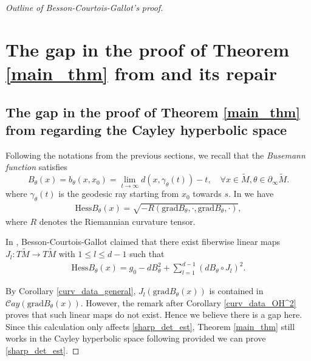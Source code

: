 \documentclass{article}
\newcommand{\del}{\partial}
\newcommand{\grad}{\mathrm{grad}}
\newcommand{\hess}{\mathrm{Hess}}
\newcommand{\Cay}{\mathcal{C}ay}
\theoremstyle{definition}
\begin{document}
\begin{proof}[Outline of Besson-Courtois-Gallot's proof]
\section{The gap in the proof of Theorem \ref{main_thm} from \cite{BCG1} and its repair}
\subsection{The gap in the proof of Theorem \ref{main_thm} from \cite{BCG1} regarding the Cayley hyperbolic space}\label{s3}
Following the notations from the previous sections, we recall that the \emph{Busemann function} satisfies
$$B_{\theta}(x)=b_\theta(x,x_0)=\lim_{t\to\infty}d(x,\gamma_\theta(t))-t,\quad\forall x\in \widetilde M, \theta\in\del_\infty \widetilde M.$$
where $\gamma_\theta(t)$ is the geodesic ray starting from $x_0$ towards $s$. In \cite[page 36]{CF} we have
\begin{align}\label{hess_gen_formula}\hess B_\theta(x)=\sqrt{-R(\grad B_\theta,\cdot,\grad B_\theta,\cdot)},\end{align}
where $R$ denotes the Riemannian curvature tensor.

In \cite[page 751]{BCG1}, Besson-Courtois-Gallot claimed that there exist fiberwise linear maps $J_l:T\widetilde M\to T\widetilde M$ with $1\leq l\leq d-1$ such that 
\begin{align}\label{hess_easy_case}\hess B_\theta(x)=g_0-dB_\theta^2+\sum_{l=1}^{d-1}(dB_\theta\circ J_l)^2.\end{align}

By Corollary \ref{curv_data_general}, $J_l(\grad B_\theta(x))$ is contained in $\Cay(\grad B_\theta(x))$. However, the remark after Corollary \ref{curv_data_OH^2} proves that such linear maps do not exist. Hence we believe there is a gap here. Since this calculation only affects \eqref{sharp_det_est}, Theorem \ref{main_thm} still works in the Cayley hyperbolic space following \cite{BCG1} provided we can prove \eqref{sharp_det_est}.








\end{proof}
\end{document}

